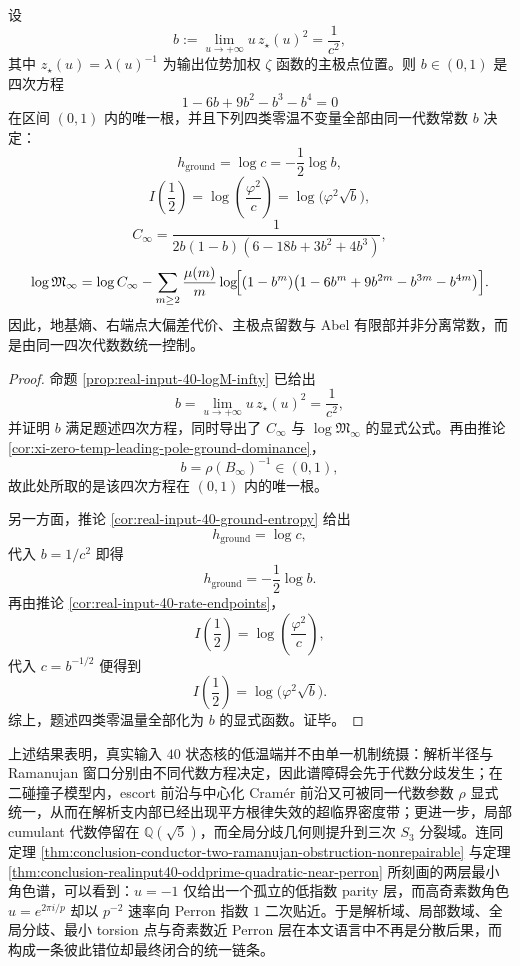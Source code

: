 \begin{theorem}[零温四次常数的统一化]\label{thm:conclusion-realinput40-zero-temp-quartic-constant-unification}
设
\[
b:=\lim_{u\to+\infty}u\,z_\star(u)^2=\frac1{c^2},
\]
其中 \(z_\star(u)=\lambda(u)^{-1}\) 为输出位势加权 \(\zeta\) 函数的主极点位置。则 \(b\in(0,1)\) 是四次方程
\[
1-6b+9b^2-b^3-b^4=0
\]
在区间 \((0,1)\) 内的唯一根，并且下列四类零温不变量全部由同一代数常数 \(b\) 决定：
\[
h_{\mathrm{ground}}
=
\log c
=
-\frac12\log b,
\]
\[
I\!\left(\frac12\right)
=
\log\!\left(\frac{\varphi^2}{c}\right)
=
\log\!\bigl(\varphi^2\sqrt b\bigr),
\]
\[
C_\infty
=
\frac{1}{2b(1-b)(6-18b+3b^2+4b^3)},
\]
\[
\log\mathfrak M_\infty
=
\log C_\infty
-\sum_{m\ge 2}\frac{\mu(m)}{m}
\log\!\Bigl[(1-b^m)\bigl(1-6b^m+9b^{2m}-b^{3m}-b^{4m}\bigr)\Bigr].
\]
因此，地基熵、右端点大偏差代价、主极点留数与 Abel 有限部并非分离常数，而是由同一四次代数数统一控制。
\end{theorem}
\begin{proof}
命题 \ref{prop:real-input-40-logM-infty} 已给出
\[
b=\lim_{u\to+\infty}u\,z_\star(u)^2=\frac1{c^2},
\]
并证明 \(b\) 满足题述四次方程，同时导出了 \(C_\infty\) 与 \(\log\mathfrak M_\infty\) 的显式公式。再由推论 \ref{cor:xi-zero-temp-leading-pole-ground-dominance}，
\[
b=\rho(B_\infty)^{-1}\in(0,1),
\]
故此处所取的是该四次方程在 \((0,1)\) 内的唯一根。

另一方面，推论 \ref{cor:real-input-40-ground-entropy} 给出
\[
h_{\mathrm{ground}}=\log c,
\]
代入 \(b=1/c^2\) 即得
\[
h_{\mathrm{ground}}=-\frac12\log b.
\]
再由推论 \ref{cor:real-input-40-rate-endpoints}，
\[
I\!\left(\frac12\right)=\log\!\left(\frac{\varphi^2}{c}\right),
\]
代入 \(c=b^{-1/2}\) 便得到
\[
I\!\left(\frac12\right)=\log\!\bigl(\varphi^2\sqrt b\bigr).
\]
综上，题述四类零温量全部化为 \(b\) 的显式函数。证毕。
\end{proof}







上述结果表明，真实输入 \(40\) 状态核的低温端并不由单一机制统摄：解析半径与 Ramanujan 窗口分别由不同代数方程决定，因此谱障碍会先于代数分歧发生；在二碰撞子模型内，escort 前沿与中心化 Cram\'er 前沿又可被同一代数参数 \(\rho\) 显式统一，从而在解析支内部已经出现平方根律失效的超临界密度带；更进一步，局部 cumulant 代数停留在 \(\mathbb Q(\sqrt5)\)，而全局分歧几何则提升到三次 \(S_3\) 分裂域。连同定理 \ref{thm:conclusion-conductor-two-ramanujan-obstruction-nonrepairable} 与定理 \ref{thm:conclusion-realinput40-oddprime-quadratic-near-perron} 所刻画的两层最小角色谱，可以看到：\(u=-1\) 仅给出一个孤立的低指数 parity 层，而高奇素数角色 \(u=e^{2\pi i/p}\) 却以 \(p^{-2}\) 速率向 Perron 指数 \(1\) 二次贴近。于是解析域、局部数域、全局分歧、最小 torsion 点与奇素数近 Perron 层在本文语言中不再是分散后果，而构成一条彼此错位却最终闭合的统一链条。

\endinput
